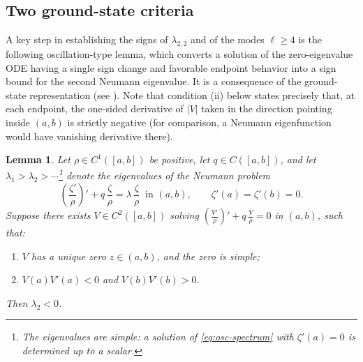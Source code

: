 \documentclass[11pt]{article}
\numberwithin{equation}{section}
\newtheorem{lemma}[theorem]{Lemma}
\theoremstyle{definition}
\begin{document}
\subsection{Two ground-state criteria}\label{ssec:criteria}


A key step in establishing the signs of $\lambda_{2,2}$ and of the modes $\ell\geq4$ is the following oscillation-type lemma, which converts a solution of the zero-eigenvalue ODE having a single sign change and favorable endpoint behavior into a sign bound for the second Neumann eigenvalue. It is a consequence of the ground-state representation (see \cite[Lemma~2.4]{PT06}). Note that condition (ii) below states precisely that, at each endpoint, the one-sided derivative of $|V|$ taken in the direction pointing inside $(a,b)$ is strictly negative (for comparison, a Neumann eigenfunction would have vanishing derivative there).

\begin{lemma}\label{lem:oscillation}
Let $\rho\in C^1([a,b])$ be positive, let $q\in C([a,b])$, and let $\lambda_1>\lambda_2>\cdots$\footnote{The eigenvalues are simple: a solution of \eqref{eq:osc-spectrum} with $\zeta'(a)=0$ is determined up to a scalar.} denote the eigenvalues of the Neumann problem
\begin{equation}\label{eq:osc-spectrum}
	\left(\frac{\zeta'}{\rho}\right)' + q\,\frac{\zeta}{\rho} = \lambda\,\frac{\zeta}{\rho} \ \text{ in } (a,b), \qquad \zeta'(a)=\zeta'(b)=0.
\end{equation}
Suppose there exists $V\in C^2([a,b])$ solving $\left(\frac{V'}{\rho}\right)' + q\,\frac{V}{\rho} = 0$ in $(a,b)$, such that:
\begin{enumerate}[label=\textup{(\roman*)}]
	\item $V$ has a unique zero $z\in(a,b)$, and the zero is simple;
	\item $V(a)V'(a)<0$ and $V(b)V'(b)>0$.
\end{enumerate}
Then $\lambda_2<0$.
\end{lemma}
\end{document}
